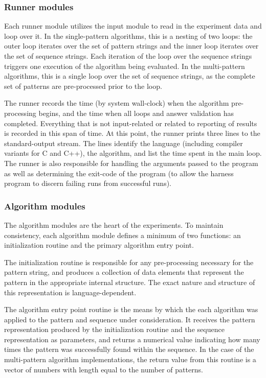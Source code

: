 \subsubsection{Runner modules}

Each runner module utilizes the input module to read in the experiment data and loop over it. In the single-pattern algorithms, this is a nesting of two loops: the outer loop iterates over the set of pattern strings and the inner loop iterates over the set of sequence strings. Each iteration of the loop over the sequence strings triggers one execution of the algorithm being evaluated. In the multi-pattern algorithms, this is a single loop over the set of sequence strings, as the complete set of patterns are pre-processed prior to the loop.

The runner records the time (by system wall-clock) when the algorithm pre-processing begins, and the time when all loops and answer validation has completed. Everything that is not input-related or related to reporting of results is recorded in this span of time. At this point, the runner prints three lines to the standard-output stream. The lines identify the language (including compiler variants for C and C++), the algorithm, and list the time spent in the main loop. The runner is also responsible for handling the arguments passed to the program as well as determining the exit-code of the program (to allow the harness program to discern failing runs from successful runs).

\subsubsection{Algorithm modules}

The algorithm modules are the heart of the experiments. To maintain consistency, each algorithm module defines a minimum of two functions: an initialization routine and the primary algorithm entry point.

The initialization routine is responsible for any pre-processing necessary for the pattern string, and produces a collection of data elements that represent the pattern in the appropriate internal structure. The exact nature and structure of this representation is language-dependent.

The algorithm entry point routine is the means by which the each algorithm was applied to the pattern and sequence under consideration. It receives the pattern representation produced by the initialization routine and the sequence representation as parameters, and returns a numerical value indicating how many times the pattern was successfully found within the sequence. In the case of the multi-pattern algorithm implementations, the return value from this routine is a vector of numbers with length equal to the number of patterns.


